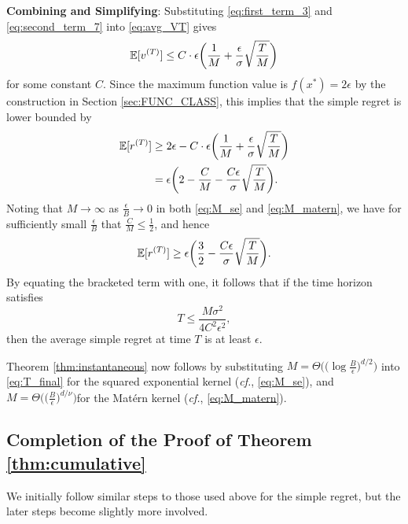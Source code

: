 \documentclass[english,onecolumn,final,11pt]{IEEEtran} %
\begin{document}
{\bf Combining and Simplifying}: Substituting \eqref{eq:first_term_3} and \eqref{eq:second_term_7} into \eqref{eq:avg_VT} gives
\begin{equation}
	\mathbb{E}[v^{(T)}] \le C\cdot \epsilon \bigg(\frac{1}{M} + \frac{\epsilon}{
	\sigma}\sqrt{\frac{T}{M}}\bigg)
\end{equation}
for some constant $C$.  Since the maximum function value is $f(x^*) = 2\epsilon$ by the construction in Section \ref{sec:FUNC_CLASS}, this implies that the simple regret is lower bounded by
\begin{align}
\mathbb{E}[r^{(T)}] 
	&\ge 2\epsilon -  C\cdot \epsilon \bigg(\frac{1}{M} + \frac{\epsilon}{\sigma}\sqrt{\frac{T}{M}}\bigg) \\
	&= \epsilon\bigg( 2 - \frac{C}{M} - \frac{C\epsilon}{\sigma}\sqrt{\frac{T}{M}} \bigg). 
\end{align}
Noting that $M \to \infty$ as $\frac{\epsilon}{B} \to 0$ in both \eqref{eq:M_se} and \eqref{eq:M_matern}, we have for sufficiently small $\frac{\epsilon}{B}$ that $\frac{C}{M} \le \frac{1}{2}$, and hence 
\begin{equation}
    \mathbb{E}[r^{(T)}] \ge \epsilon\bigg( \frac{3}{2} - \frac{C\epsilon}{\sigma}\sqrt{\frac{T}{M}} \bigg). \label{eq:RT_LB}
\end{equation}
By equating the bracketed term with one, it follows that if the time horizon satisfies
\begin{equation}
	T \le \frac{M \sigma^2}{4C^2 \epsilon^2}, \label{eq:T_final}
\end{equation}
then the average simple regret at time $T$ is at least $\epsilon$.  

Theorem \ref{thm:instantaneous} now follows by substituting $M = \Theta\big( \big(\log\frac{B}{\epsilon}\big)^{d/2} \big)$ into \eqref{eq:T_final} for the squared exponential kernel (\emph{cf.}, \eqref{eq:M_se}), and $M = \Theta\big(\big( \frac{B}{\epsilon} \big)^{d/\nu}\big)$for the Mat\'ern kernel (\emph{cf.}, \eqref{eq:M_matern}).

\subsection{Completion of the Proof of Theorem \ref{thm:cumulative}}

We initially follow similar steps to those used above for the simple regret, but the later steps become slightly more involved. 
\end{document}
